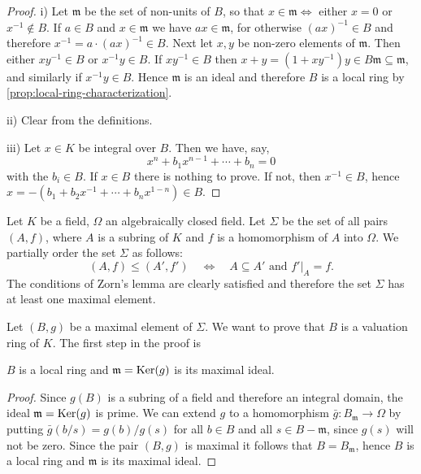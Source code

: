 \begin{proof}
    i) Let $\mathfrak{m}$ be the set of non-units of $B$, so that $x \in \mathfrak{m} \iff$ either $x = 0$ or $x^{-1} \notin B$. If $a \in B$ and $x \in \mathfrak{m}$ we have $ax \in \mathfrak{m}$, for otherwise $(ax)^{-1} \in B$ and therefore $x^{-1} = a \cdot (ax)^{-1} \in B$. Next let $x, y$ be non-zero elements of $\mathfrak{m}$. Then either $x y^{-1} \in B$ or $x^{-1} y \in B$. If $x y^{-1} \in B$ then $x + y = (1 + x y^{-1})y \in B \mathfrak{m} \subseteq \mathfrak{m}$, and similarly if $x^{-1} y \in B$. Hence $\mathfrak{m}$ is an ideal and therefore $B$ is a local ring by \eqref{prop:local-ring-characterization}.

    ii) Clear from the definitions.

    iii) Let $x \in K$ be integral over $B$. Then we have, say,
    \[
    x^n + b_1 x^{n-1} + \cdots + b_n = 0
    \]
    with the $b_i \in B$. If $x \in B$ there is nothing to prove. If not, then $x^{-1} \in B$, hence $x = -(b_1 + b_2 x^{-1} + \cdots + b_n x^{1-n}) \in B$.
\end{proof}

Let $K$ be a field, $\Omega$ an algebraically closed field. Let $\Sigma$ be the set of all pairs $(A, f)$, where $A$ is a subring of $K$ and $f$ is a homomorphism of $A$ into $\Omega$. We partially order the set $\Sigma$ as follows:
\[
(A, f) \leq (A', f') \quad \iff \quad A \subseteq A' \text{ and } f'|_A = f.
\]
The conditions of Zorn's lemma are clearly satisfied and therefore the set $\Sigma$ has at least one maximal element.

Let $(B, g)$ be a maximal element of $\Sigma$. We want to prove that $B$ is a valuation ring of $K$. The first step in the proof is

\begin{lemma}\label{lem:5.19}
$B$ is a local ring and $\mathfrak{m} = \operatorname{Ker}(g)$ is its maximal ideal.
\end{lemma}

\begin{proof}
Since $g(B)$ is a subring of a field and therefore an integral domain, the ideal $\mathfrak{m} = \operatorname{Ker}(g)$ is prime. We can extend $g$ to a homomorphism $\bar{g} \colon B_{\mathfrak{m}} \to \Omega$ by putting $\bar{g}(b/s) = g(b)/g(s)$ for all $b \in B$ and all $s \in B - \mathfrak{m}$, since $g(s)$ will not be zero. Since the pair $(B, g)$ is maximal it follows that $B = B_{\mathfrak{m}}$, hence $B$ is a local ring and $\mathfrak{m}$ is its maximal ideal.
\end{proof}

